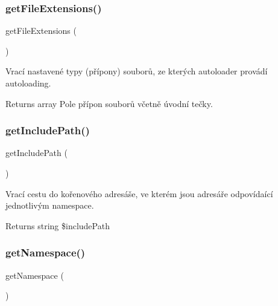 \subsubsection{\texorpdfstring{get\+File\+Extensions()}{getFileExtensions()}}
{\footnotesize\ttfamily get\+File\+Extensions (\begin{DoxyParamCaption}{ }\end{DoxyParamCaption})}

Vrací nastavené typy (přípony) souborů, ze kterých autoloader provádí autoloading. \begin{DoxyReturn}{Returns}
array Pole přípon souborů včetně úvodní tečky. 
\end{DoxyReturn}
\mbox{\label{class_autoloader___autoloader_o_l_d_a621c05f2bef78888deeac9c15e87f0c6}} 
\subsubsection{\texorpdfstring{get\+Include\+Path()}{getIncludePath()}}
{\footnotesize\ttfamily get\+Include\+Path (\begin{DoxyParamCaption}{ }\end{DoxyParamCaption})}

Vrací cestu do kořenového adresáše, ve kterém jsou adresáře odpovídaící jednotlivým namespace. \begin{DoxyReturn}{Returns}
string \$include\+Path 
\end{DoxyReturn}
\mbox{\label{class_autoloader___autoloader_o_l_d_a2614df64646ac71b70b1e1074258052b}} 
\subsubsection{\texorpdfstring{get\+Namespace()}{getNamespace()}}
{\footnotesize\ttfamily get\+Namespace (\begin{DoxyParamCaption}{ }\end{DoxyParamCaption})}

